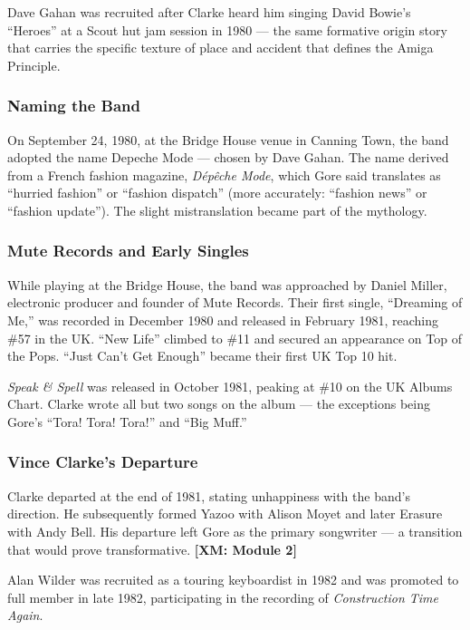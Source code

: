 \documentclass[11pt,letterpaper]{article}
\begin{document}
Dave Gahan was recruited after Clarke heard him singing David Bowie's ``Heroes'' at a Scout hut jam session in 1980 --- the same formative origin story that carries the specific texture of place and accident that defines the Amiga Principle.

\subsubsection{Naming the Band}

On September 24, 1980, at the Bridge House venue in Canning Town, the band adopted the name Depeche Mode --- chosen by Dave Gahan. The name derived from a French fashion magazine, \textit{Dépêche Mode}, which Gore said translates as ``hurried fashion'' or ``fashion dispatch'' (more accurately: ``fashion news'' or ``fashion update''). The slight mistranslation became part of the mythology.

\subsubsection{Mute Records and Early Singles}

While playing at the Bridge House, the band was approached by Daniel Miller, electronic producer and founder of Mute Records. Their first single, ``Dreaming of Me,'' was recorded in December 1980 and released in February 1981, reaching \#57 in the UK. ``New Life'' climbed to \#11 and secured an appearance on Top of the Pops. ``Just Can't Get Enough'' became their first UK Top 10 hit.

\textit{Speak \& Spell} was released in October 1981, peaking at \#10 on the UK Albums Chart. Clarke wrote all but two songs on the album --- the exceptions being Gore's ``Tora! Tora! Tora!'' and ``Big Muff.''

\subsubsection{Vince Clarke's Departure}

Clarke departed at the end of 1981, stating unhappiness with the band's direction. He subsequently formed Yazoo with Alison Moyet and later Erasure with Andy Bell. His departure left Gore as the primary songwriter --- a transition that would prove transformative. \textbf{[XM: Module 2]}

Alan Wilder was recruited as a touring keyboardist in 1982 and was promoted to full member in late 1982, participating in the recording of \textit{Construction Time Again}.
\end{document}
